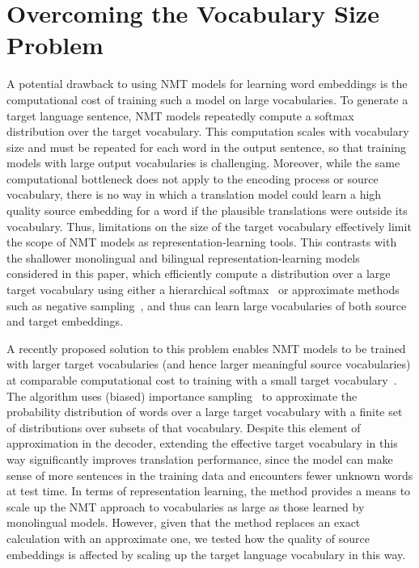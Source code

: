 \documentclass{article} %
\begin{document}
\section{Overcoming the Vocabulary Size Problem}

A potential drawback to using NMT models for learning word embeddings is the computational cost of training such a model on large vocabularies. To generate a target language sentence, NMT models repeatedly compute a softmax distribution over the target vocabulary. This computation scales with vocabulary size and must be repeated for each word in the output sentence, so that training models with large output vocabularies is challenging. Moreover, while the same computational bottleneck does not apply to the encoding process or source vocabulary, there is no way in which a translation model could learn a high quality source embedding for a word if the plausible translations were outside its vocabulary. Thus, limitations on the size of the target vocabulary effectively limit the scope of NMT models as representation-learning tools. This contrasts with the shallower monolingual and bilingual representation-learning models considered in this paper,  which efficiently compute a distribution over a large target vocabulary using either a hierarchical softmax~\citep{morin2005hierarchical} or approximate methods such as negative sampling~\citep{mikolov2013distributed,Hermann:2014:ICLR}, and thus can learn large vocabularies of both source and target embeddings.

A recently proposed solution to this problem enables NMT models to be trained with larger target vocabularies (and hence larger meaningful source vocabularies) at comparable computational cost to training with a small target vocabulary~\citep{Jean}. The algorithm uses (biased) importance sampling~\citep{Bengio+Senecal-2003-small} to approximate the probability distribution of words over a large target vocabulary with a finite set of distributions over subsets of that vocabulary. Despite this element of approximation in the decoder, extending the effective target vocabulary in this way significantly improves translation performance, since the model can make sense of more sentences in the training data and encounters fewer unknown words at test time. In terms of representation learning, the method provides a means to scale up the NMT approach to vocabularies as large as those learned by monolingual models. However, given that the method replaces an exact calculation with an approximate one, we tested how the quality of source embeddings is affected by scaling up the target language vocabulary in this way. 
\end{document}
